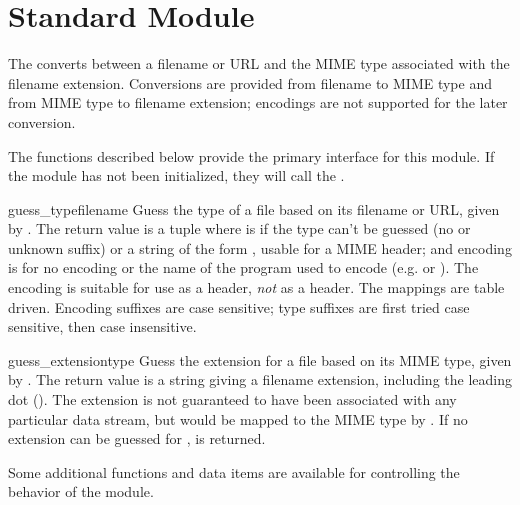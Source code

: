 
\section{Standard Module }
\label{module-mimetypes}

The  converts between a filename or URL and the MIME
type associated with the filename extension.  Conversions are provided 
from filename to MIME type and from MIME type to filename extension;
encodings are not supported for the later conversion.

The functions described below provide the primary interface for this
module.  If the module has not been initialized, they will call the
.


\begin{funcdesc}{guess_type}{filename}
Guess the type of a file based on its filename or URL, given by
.
The return value is a tuple  where
 is  if the type can't be guessed (no or unknown
suffix) or a string of the form ,
usable for a MIME  header; and 
encoding is  for no encoding or the name of the program used
to encode (e.g.  or ).  The encoding
is suitable for use as a  header,
\emph{not} as a  header.  The mappings
are table driven.  Encoding suffixes are case sensitive; type suffixes
are first tried case sensitive, then case insensitive.
\end{funcdesc}

\begin{funcdesc}{guess_extension}{type}
Guess the extension for a file based on its MIME type, given by
.
The return value is a string giving a filename extension, including the
leading dot ().  The extension is not guaranteed to have been
associated with any particular data stream, but would be mapped to the 
MIME type  by .  If no extension can
be guessed for ,  is returned.
\end{funcdesc}


Some additional functions and data items are available for controlling
the behavior of the module.


